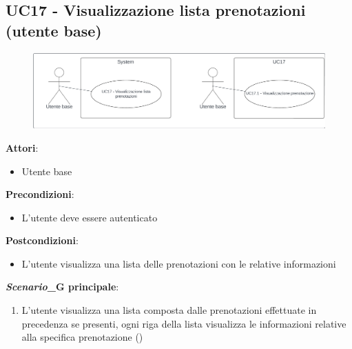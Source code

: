 \subsection{UC17 - Visualizzazione lista prenotazioni (utente base)} \label{usecase:17}
\begin{figure}[H]
  \centering
  \includegraphics[width=1\textwidth]{ucd/UCD17.png}
\end{figure}
\textbf{Attori}:
\begin{itemize}
    \item Utente base
\end{itemize}
\textbf{Precondizioni}:
\begin{itemize}
    \item L'utente deve essere autenticato
\end{itemize}
\textbf{Postcondizioni}:
\begin{itemize}
    \item L'utente visualizza una lista delle prenotazioni con le relative informazioni
\end{itemize}
\textbf{\textit{Scenario}_G principale}:
\begin{enumerate}
    \item L'utente visualizza una lista composta dalle prenotazioni effettuate in precedenza se presenti, ogni riga della lista visualizza le informazioni relative alla specifica prenotazione ()
\end{enumerate}

